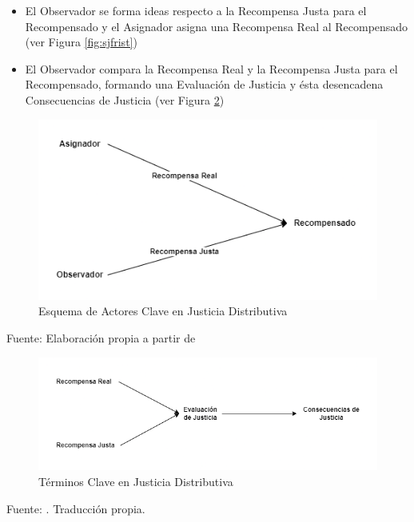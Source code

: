 \documentclass[12pt,twoside]{templates/facsothesis}
\begin{document}
\begin{itemize}
\item
  El Observador se forma ideas respecto a la Recompensa Justa para el Recompensado y el Asignador asigna una Recompensa Real al Recompensado (ver Figura \ref{fig:sjfrist})
\item
  El Observador compara la Recompensa Real y la Recompensa Justa para el Recompensado, formando una Evaluación de Justicia y ésta desencadena Consecuencias de Justicia (ver Figura \ref{fig:sjsecond})
\end{itemize}

\begin{figure}[!ht]
\includegraphics[width=0.75\linewidth,]{images/sjfirst} \caption{Esquema de Actores Clave en Justicia Distributiva}\label{fig:sjfirst}
\end{figure}

Fuente: Elaboración propia a partir de \citet{Jasso2016}

\begin{figure}[!ht]
\includegraphics[width=0.75\linewidth,]{images/sjsecond} \caption{Términos Clave en Justicia Distributiva}\label{fig:sjsecond}
\end{figure}

Fuente: \citet{Jasso2016}. Traducción propia.
\end{document}
